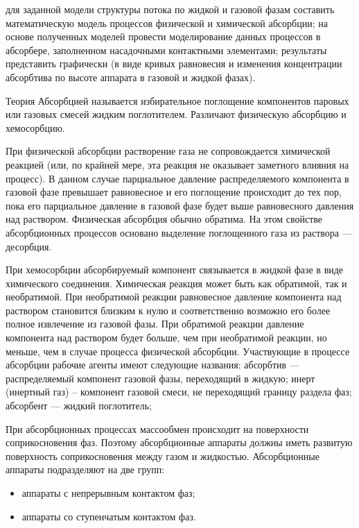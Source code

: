 
\goal для заданной модели структуры потока по жидкой и газовой фазам составить математическую модель процессов физической и химической абсорбции; на основе полученных моделей провести моделирование данных процессов в абсорбере, заполненном насадочными контактными элементами; результаты представить графически (в виде кривых равновесия и изменения концентрации абсорбтива по высоте аппарата в газовой и жидкой фазах).

Теория
Абсорбцией называется избирательное поглощение компонентов паровых или газовых смесей жидким поглотителем. Различают физическую абсорбцию и хемосорбцию.

При физической абсорбции растворение газа не сопровождается химической реакцией (или, по крайней мере, эта реакция не оказывает заметного влияния на процесс). В данном случае парциальное давление распределяемого компонента в газовой фазе превышает равновесное и его поглощение происходит до тех пор, пока его парциальное давление в газовой фазе будет выше равновесного давления над раствором. Физическая абсорбция обычно обратима. На этом свойстве абсорбционных процессов основано выделение поглощенного газа из раствора --- десорбция.

При хемосорбции абсорбируемый компонент связывается в жидкой фазе в виде химического соединения. Химическая реакция может быть как обратимой, так и необратимой. При необратимой реакции равновесное давление компонента над раствором становится близким к нулю и соответственно возможно его более полное извлечение из газовой фазы. При обратимой реакции давление компонента над раствором будет больше, чем при необратимой реакции, но меньше, чем в случае процесса физической абсорбции.
Участвующие в процессе абсорбции рабочие агенты имеют следующие названия:
абсорбтив --- распределяемый компонент газовой фазы, переходящий в жидкую;
инерт (инертный газ) -- компонент газовой смеси, не переходящий границу раздела фаз;
абсорбент --- жидкий поглотитель;

При абсорбционных процессах массообмен происходит на поверхности соприкосновения фаз. Поэтому абсорбционные аппараты должны иметь развитую поверхность соприкосновения между газом и жидкостью. Абсорбционные аппараты подразделяют на две групп:
\begin{itemize}
\item аппараты с непрерывным контактом фаз;
\item аппараты со ступенчатым контактом фаз.
\end{itemize}

